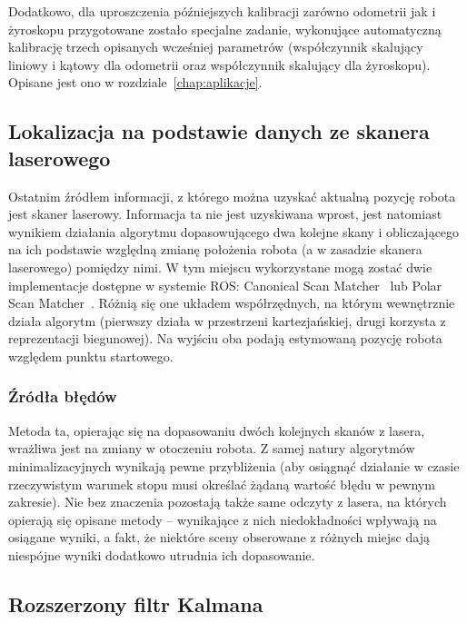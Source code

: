 Dodatkowo, dla uproszczenia późniejszych kalibracji zarówno odometrii jak i
żyroskopu przygotowane zostało specjalne zadanie, wykonujące automatyczną
kalibrację trzech opisanych wcześniej parametrów (współczynnik skalujący
liniowy i kątowy dla odometrii oraz współczynnik skalujący dla żyroskopu).
Opisane jest ono w rozdziale~\ref{chap:aplikacje}.

\subsection{Lokalizacja na podstawie danych ze skanera laserowego}

Ostatnim źródłem informacji, z którego można uzyskać aktualną pozycję robota
jest skaner laserowy. Informacja ta nie jest uzyskiwana wprost, jest natomiast
wynikiem działania algorytmu dopasowującego dwa kolejne skany i obliczającego
na ich podstawie względną zmianę położenia robota (a w zasadzie skanera laserowego)
pomiędzy nimi. W tym miejscu wykorzystane mogą zostać dwie implementacje
dostępne w systemie ROS: Canonical Scan Matcher~\cite{4543181} lub Polar Scan
Matcher~\cite{1545181}. Różnią się one układem współrzędnych, na którym
wewnętrznie działa algorytm (pierwszy działa w przestrzeni kartezjańskiej,
drugi korzysta z reprezentacji biegunowej). Na wyjściu oba podają estymowaną
pozycję robota względem punktu startowego.

\subsubsection{Źródła błędów}

Metoda ta, opierając się na dopasowaniu dwóch kolejnych skanów z lasera,
wrażliwa jest na zmiany w otoczeniu robota. Z samej natury algorytmów
minimalizacyjnych wynikają pewne przybliżenia (aby osiągnąć działanie w czasie
rzeczywistym warunek stopu musi określać żądaną wartość błędu w pewnym
zakresie). Nie bez znaczenia pozostają także same odczyty z lasera, na których
opierają się opisane metody -- wynikające z nich niedokładności wpływają na
osiągane wyniki, a fakt, że niektóre sceny obserowane z różnych miejsc dają
niespójne wyniki dodatkowo utrudnia ich dopasowanie.

\subsection{Rozszerzony filtr Kalmana}

